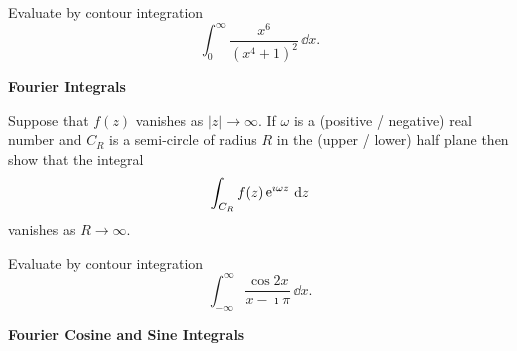 {\begin{Exercise}
\end{Exercise}







\begin{Exercise}
  \label{exercise x^6/(x^4+1)^2}
  Evaluate by contour integration
  \[
  \int_0^\infty \frac{ x^6 }{ (x^4 + 1)^2 } \,\dd x.
  \]

\end{Exercise}








\begin{large}
  \noindent
  \textbf{Fourier Integrals}
\end{large}



\begin{Exercise}
  \label{exercise jordan's lemma}
  Suppose that $f(z)$ vanishes as $|z| \to \infty$.
  If $\omega$ is a (positive / negative) real number and $C_R$ is a 
  semi-circle of radius $R$ in the (upper / lower) half plane then 
  show that the integral
  \[
  \int_{C_R} f(z)  \mathop{\mathrm{e}}\nolimits^{\imath \omega z} \,\mathrm{d} z
  \]
  vanishes as $R \to \infty$.

\end{Exercise}




\begin{Exercise}
  \label{exercise cos(2x)/(x-i pi)}
  Evaluate by contour integration
  \[
  \int_{-\infty}^\infty \frac{ \cos 2 x }{ x - \imath \pi } \,\dd x.
  \]

\end{Exercise}








\begin{large}
  \noindent
  \textbf{Fourier Cosine and Sine Integrals}
\end{large}









}
